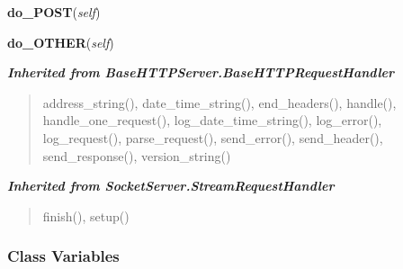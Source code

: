     \label{Proxy:Proxy:do_POST}

    \vspace{0.5ex}

\hspace{.8\funcindent}\begin{boxedminipage}{\funcwidth}

    \raggedright \textbf{do\_POST}(\textit{self})

\setlength{\parskip}{2ex}
\setlength{\parskip}{1ex}
    \end{boxedminipage}

    \label{Proxy:Proxy:do_OTHER}

    \vspace{0.5ex}

\hspace{.8\funcindent}\begin{boxedminipage}{\funcwidth}

    \raggedright \textbf{do\_OTHER}(\textit{self})

\setlength{\parskip}{2ex}
\setlength{\parskip}{1ex}
    \end{boxedminipage}


\large{\textbf{\textit{Inherited from BaseHTTPServer.BaseHTTPRequestHandler}}}

\begin{quote}
address\_string(), date\_time\_string(), end\_headers(), handle(), handle\_one\_request(), log\_date\_time\_string(), log\_error(), log\_request(), parse\_request(), send\_error(), send\_header(), send\_response(), version\_string()
\end{quote}

\large{\textbf{\textit{Inherited from SocketServer.StreamRequestHandler}}}

\begin{quote}
finish(), setup()
\end{quote}


  \subsubsection{Class Variables}


